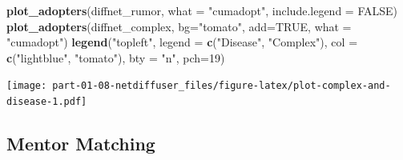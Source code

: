 \documentclass[]{book}
\newenvironment{Shaded}{\begin{snugshade}}{\end{snugshade}}
\newcommand{\CommentTok}[1]{\textcolor[rgb]{0.56,0.35,0.01}{\textit{#1}}}
\newcommand{\DataTypeTok}[1]{\textcolor[rgb]{0.13,0.29,0.53}{#1}}
\newcommand{\DecValTok}[1]{\textcolor[rgb]{0.00,0.00,0.81}{#1}}
\newcommand{\KeywordTok}[1]{\textcolor[rgb]{0.13,0.29,0.53}{\textbf{#1}}}
\newcommand{\NormalTok}[1]{#1}
\newcommand{\OperatorTok}[1]{\textcolor[rgb]{0.81,0.36,0.00}{\textbf{#1}}}
\newcommand{\OtherTok}[1]{\textcolor[rgb]{0.56,0.35,0.01}{#1}}
\newcommand{\StringTok}[1]{\textcolor[rgb]{0.31,0.60,0.02}{#1}}
\begin{document}
\begin{Shaded}
\begin{Highlighting}[]
\KeywordTok{plot_adopters}\NormalTok{(diffnet_rumor, }\DataTypeTok{what =} \StringTok{"cumadopt"}\NormalTok{, }\DataTypeTok{include.legend =} \OtherTok{FALSE}\NormalTok{)}
\KeywordTok{plot_adopters}\NormalTok{(diffnet_complex, }\DataTypeTok{bg=}\StringTok{"tomato"}\NormalTok{, }\DataTypeTok{add=}\OtherTok{TRUE}\NormalTok{, }\DataTypeTok{what =} \StringTok{"cumadopt"}\NormalTok{)}
\KeywordTok{legend}\NormalTok{(}\StringTok{"topleft"}\NormalTok{, }\DataTypeTok{legend =} \KeywordTok{c}\NormalTok{(}\StringTok{"Disease"}\NormalTok{, }\StringTok{"Complex"}\NormalTok{), }\DataTypeTok{col =} \KeywordTok{c}\NormalTok{(}\StringTok{"lightblue"}\NormalTok{, }\StringTok{"tomato"}\NormalTok{),}
       \DataTypeTok{bty =} \StringTok{"n"}\NormalTok{, }\DataTypeTok{pch=}\DecValTok{19}\NormalTok{)}
\end{Highlighting}
\end{Shaded}

\texttt{[image: part-01-08-netdiffuser\_files/figure-latex/plot-complex-and-disease-1.pdf]}

\hypertarget{mentor-matching}{%
\subsection{Mentor Matching}\label{mentor-matching}}

\begin{Shaded}
\end{Shaded}
\end{document}

